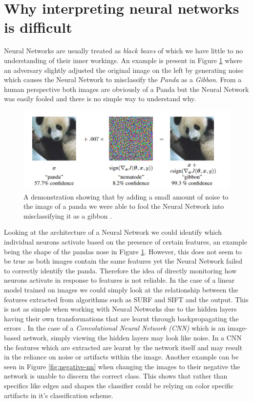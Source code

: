 \section{Why interpreting neural networks is difficult}
Neural Networks are usually treated as \emph{black boxes} of which we have little to no understanding of their inner workings. An example is present in Figure \ref{fig:panada-nn} where an adversary \cite{szegedy2014intriguing} slightly adjusted the original image on the left by generating noise which causes the Neural Network to misclassify the \emph{Panda} as a \emph{Gibbon}. From a human perspective both images are obviously of a Panda but the Neural Network was easily fooled and there is no simple way to understand why. 
\begin  {figure}[!htpb]
  \includegraphics[width=\linewidth]{Introduction_Images/nn-unexplainable.png}
   \caption{A demonstration showing that by adding a small amount of noise to the image of a panda we were able to fool the Neural Network into misclassifying it as a gibbon \cite{goodfellow2015explaining}.}
    \label{fig:panada-nn}
\end{figure}
Looking at the architecture of a Neural Network we could identify which individual neurons activate based on the presence of certain features, an example being the shape of the pandas nose in Figure \ref{fig:panada-nn}. However, this does not seem to be true as both images contain the same features yet the Neural Network failed to correctly identify the panda. Therefore the idea of directly monitoring how neurons activate in response to features is not reliable. In the case of a linear model trained on images we could simply look at the relationship between the features extracted from algorithms such as SURF \cite{10.1016/j.cviu.2007.09.014} and SIFT \cite{Wu2013ACS} and the output. This is not as simple when working with Neural Networks due to the hidden layers having their own transformations that are learnt through backpropagating the errors \cite{10.5555/65669.104451}\cite{10.5555/525960}. In the case of a \emph{Convolutional Neural Network (CNN)} \cite{DBLP:journals/corr/Schmidhuber14} which is an image-based network, simply viewing the hidden layers may look like noise. In a CNN the features which are extracted are learnt by the network itself and may result in the reliance on noise or artifacts within the image. Another example can be seen in Figure \ref{fig:negative-nn} when changing the images to their negative the network is unable to discern the correct class. This shows that rather than specifics like edges and shapes the classifier could be relying on color specific artifacts in it's classification scheme.

